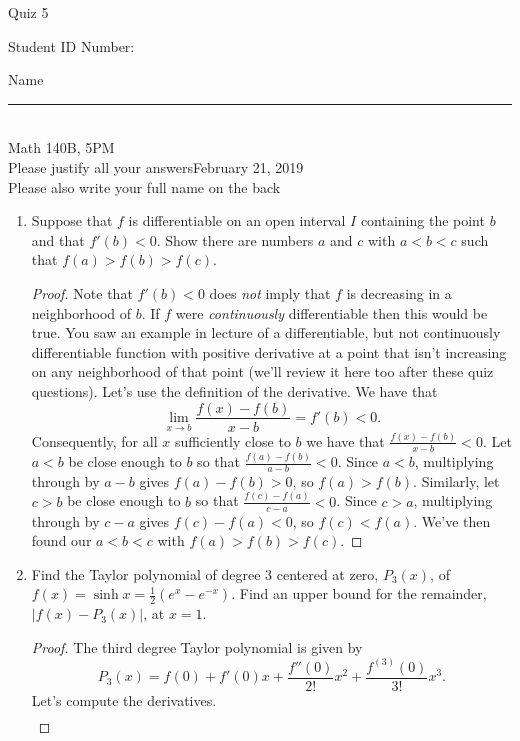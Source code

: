 \documentclass[12pt]{article}
\begin{document}
\begin{flushleft} 
\centerline{\LARGE{Quiz 5}} 
\vspace{5 mm}
{Student ID Number:}\hfill  
{Name \rule {2 in}{0.01in}}\\
Math 140B, 5PM
\\
{Please justify all your answers}\hfill {February 21, 2019}
\\
{Please also write your full name on the back} 

\medskip
\end{flushleft}

\begin{enumerate}
	\item Suppose that $f$ is differentiable on an open interval $I$ containing the point $b$ and that $f'(b)<0$. Show there are numbers $a$ and $c$ with $a<b<c$ such that $f(a)>f(b)>f(c)$.
	\begin{proof}
		Note that $f'(b)<0$ does \textit{not} imply that $f$ is decreasing in a neighborhood of $b$. If $f$ were \textit{continuously} differentiable then this would be true. You saw an example in lecture of a differentiable, but not continuously differentiable function with positive derivative at a point that isn't increasing on any neighborhood of that point (we'll review it here too after these quiz questions). Let's use the definition of the derivative. We have that
		\[
		\lim_{x\to b}\frac{f(x)-f(b)}{x-b} = f'(b)<0.
		\]
		Consequently, for all $x$ sufficiently close to $b$ we have that $\frac{f(x)-f(b)}{x-b}<0$. Let $a<b$ be close enough to $b$ so that $\frac{f(a)-f(b)}{a-b}<0$. Since $a<b$, multiplying through by $a-b$ gives $f(a)-f(b)>0$, so $f(a)>f(b)$. Similarly, let $c>b$ be close enough to $b$ so that $\frac{f(c)-f(a)}{c-a}<0$. Since $c>a$, multiplying through by $c-a$ gives $f(c)-f(a)<0$, so $f(c)<f(a)$. We've then found our $a<b<c$ with $f(a)>f(b)>f(c)$.
	\end{proof}
	\vfill
	\item Find the Taylor polynomial of degree 3 centered at zero, $P_3(x)$, of $f(x) = \sinh x = \frac{1}{2}(e^{x}-e^{-x})$. Find an upper bound for the remainder, $|f(x)-P_3(x)|$, at $x = 1$.
	\begin{proof}
		The third degree Taylor polynomial is given by
		\[
		P_3(x) = f(0) + f'(0)x + \frac{f''(0)}{2!}x^2 + \frac{f^{(3)}(0)}{3!}x^3.
		\]
		Let's compute the derivatives.
		\begin{gather*}

\end{gather*}
\end{proof}
\end{enumerate}
\end{document}
